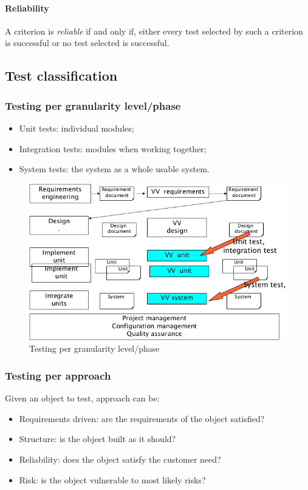 \paragraph{Reliability} A criterion is \emph{reliable} if and only if, either every test selected by such a criterion is successful or no test selected is successful.

\subsection{Test classification}
\subsubsection{Testing per granularity level/phase}
\begin{itemize}
\item Unit tests: individual modules;
\item Integration tests: modules when working together;
\item System tests: the system as a whole usable system.
\end{itemize}

\begin{figure}[hbtp]
\centering
\includegraphics[scale=0.35]{images/testing_granularity_level.png}
\caption{Testing per granularity level/phase}
\end{figure}

\subsubsection{Testing per approach}
Given an object to test, approach can be:
\begin{itemize}
\item Requirements driven: are the requirements of the object satisfied?
\item Structure: is the object built as it should?
\item Reliability: does the object satisfy the customer need?
\item Risk: is the object vulnerable to most likely risks?
\end{itemize}

